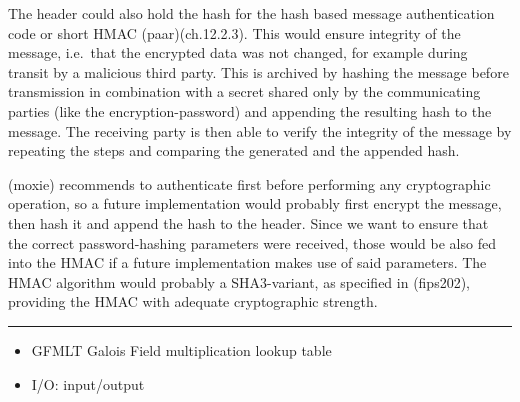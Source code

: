 The header could also hold the hash for the hash based message
authentication code or short HMAC (paar)(ch.12.2.3). This would ensure
integrity of the message, i.e.~that the encrypted data was not changed,
for example during transit by a malicious third party. This is archived
by hashing the message before transmission in combination with a secret
shared only by the communicating parties (like the encryption-password)
and appending the resulting hash to the message. The receiving party is
then able to verify the integrity of the message by repeating the steps
and comparing the generated and the appended hash.

(moxie) recommends to authenticate first before performing any
cryptographic operation, so a future implementation would probably first
encrypt the message, then hash it and append the hash to the header.
Since we want to ensure that the correct password-hashing parameters
were received, those would be also fed into the HMAC if a future
implementation makes use of said parameters. The HMAC algorithm would
probably a SHA3-variant, as specified in (fips202), providing the HMAC
with adequate cryptographic strength.

\begin{center}\rule{0.5\linewidth}{0.5pt}\end{center}

\begin{itemize}
\tightlist
\item
  GFMLT Galois Field multiplication lookup table
\item
  I/O: input/output
\end{itemize}
